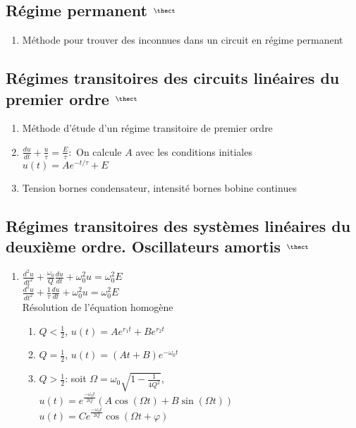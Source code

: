 \documentclass[fleqn]{article}
\theoremstyle{definition} \newtheorem*{defi}{D\'efinition}
\theoremstyle{definition} \newtheorem*{theo}{Th\'eor\`eme}
\theoremstyle{definition} \newtheorem*{coro}{Corollaire}
\theoremstyle{remark} \newtheorem*{rqs}{Remarques}
\theoremstyle{definition} \newtheorem*{prop}{Propri\'et\'e}
\begin{document}
\subsection{R\'egime permanent $^{\thect}$}
\begin{enumerate}
	\item M\'ethode pour trouver des inconnues dans un circuit en r\'egime permanent
\end{enumerate}

\subsection{R\'egimes transitoires des circuits lin\'eaires du premier ordre $^{\thect}$}
\begin{enumerate}
	\item M\'ethode d'\'etude d'un r\'egime transitoire de premier ordre
	\item $\frac{du}{dt} + \frac{u}{\tau} = \frac{E}{\tau}:$ On calcule $A$ avec les conditions initiales \\
		$u(t) = Ae^{-t/\tau} + E$
	\item Tension bornes condensateur, intensit\'e bornes bobine continues
\end{enumerate}

\subsection{R\'egimes transitoires des syst\`emes lin\'eaires du deuxi\`eme ordre. Oscillateurs amortis $^{\thect}$}
\begin{enumerate}
	\item $\frac{d^2u}{dt^2} + \frac{\omega_0}{Q} \frac{du}{dt} + \omega_0^2 u = \omega_0^2 E$\\
		$\frac{d^2u}{dt^2} + \frac{1}{\tau} \frac{du}{dt} + \omega_0^2 u = \omega_0^2 E$\\
		R\'esolution de l'\'equation homog\`ene
		\begin{enumerate}
			\item $Q < \frac{1}{2}$, $u(t) = Ae^{r_1 t} + B e^{r_2 t}$
			\item $Q = \frac{1}{2}$, $u(t) = (At + B)e^{-\omega_0 t}$
			\item $Q > \frac{1}{2}$: soit $\Omega = \omega_0 \sqrt{1 - \frac{1}{4Q^2}}$,
				\\ $u(t) = e^{\frac{-\omega_0 t}{2Q}}(A\cos(\Omega t) + B\sin(\Omega t))$\\
				$u(t) = C e^{\frac{-\omega_0 t}{2Q}} \cos(\Omega t + \varphi)$
		\end{enumerate}
\end{enumerate}
\end{document}
